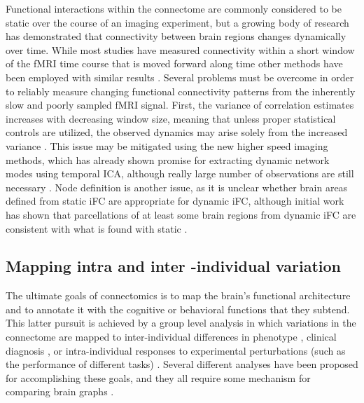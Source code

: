 \documentclass{bmcart}
\begin{document}
Functional interactions within the connectome are commonly considered to be static over the course of an imaging experiment, but a growing body of research has demonstrated that connectivity between brain regions changes dynamically over time\cite{Hutchison2013}. While most studies have measured connectivity within a short window of the fMRI time course that is moved forward along time \cite{Keilholz2013,Chang2010,Yang2014,Allen2014} other methods have been employed with similar results  \cite{Majeed2011,Smith2012}. Several problems must be overcome in order to reliably measure changing functional connectivity patterns from the inherently slow and poorly sampled fMRI signal. First, the variance of correlation estimates increases with decreasing window size, meaning that unless proper statistical controls are utilized, the observed dynamics may arise solely from the increased variance \cite{Handwerker2012}. This issue may be mitigated using the new higher speed imaging methods, which has already shown promise for extracting dynamic network modes using temporal ICA, although really large number of observations are still necessary \cite{Smith2012}. Node definition is another issue, as it is unclear whether brain areas defined from static iFC are appropriate for dynamic iFC, although initial work has shown that parcellations of at least some brain regions from dynamic iFC are consistent with what is found with static \cite{Yang2014}.

\subsection{Mapping intra and inter -individual variation} 

The ultimate goals of connectomics is to map the brain's functional architecture and to annotate it with the cognitive or behavioral functions that they subtend. This latter pursuit is achieved by a group level analysis in which variations in the connectome are mapped to inter-individual differences in phenotype \cite{Kelly2012}, clinical diagnosis \cite{Castellanos2013}, or intra-individual responses to experimental perturbations (such as the performance of different tasks) \cite{Shirer2012,Krienen2014,Cole2014}. Several different analyses have been proposed for accomplishing these goals, and they all require some mechanism for comparing brain graphs \cite{Varoquaux2013}. 
 
\end{document}
